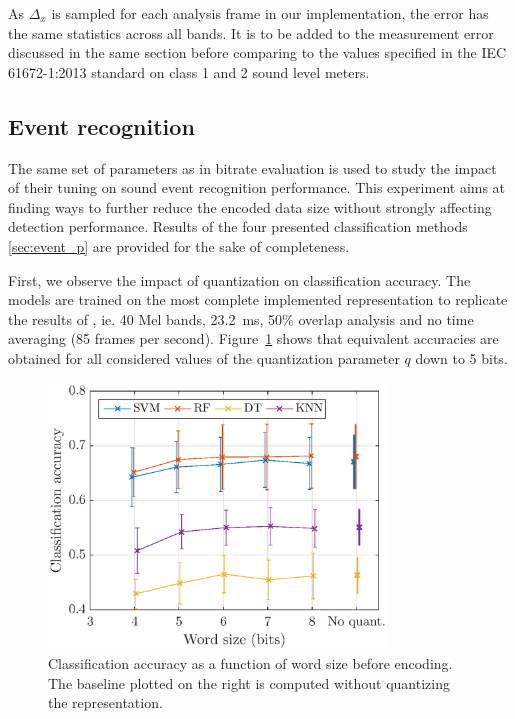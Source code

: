 \documentclass[sensors,article,submit,moreauthors,pdftex,10pt,a4paper]{mdpi}
\begin{document}
As $\Delta_x$ is sampled for each analysis frame in our implementation, the error has the same statistics across all bands. It is to be added to the measurement error discussed in the same section before comparing to the values specified in the IEC 61672-1:2013 \cite{iec-norm2} standard on class 1 and 2 sound level meters.

\subsection{Event recognition} \label{sec:event_r}

The same set of parameters as in bitrate evaluation is used to study the impact of their tuning on sound event recognition performance. This experiment aims at finding ways to further reduce the encoded data size without strongly affecting detection performance. Results of the four presented classification methods \ref{sec:event_p} are provided for the sake of completeness.

First, we observe the impact of quantization on classification accuracy. The models are trained on the most complete implemented representation to replicate the results of \citep{salamon2014}, ie. 40 Mel bands, 23.2~ms, 50\% overlap analysis and no time averaging (85 frames per second). Figure~\ref{fig:class_mel_q} shows that equivalent accuracies are obtained for all considered values of the quantization parameter $q$ down to 5 bits.\\

\begin{figure}[htbp]
	\centering
		\includegraphics[width=0.8\textwidth]{figures/class_mel_q.eps}
	\caption{Classification accuracy as a function of word size before encoding. The baseline plotted on the right is computed without quantizing the representation.}
	\label{fig:class_mel_q}
\end{figure}
\end{document}
